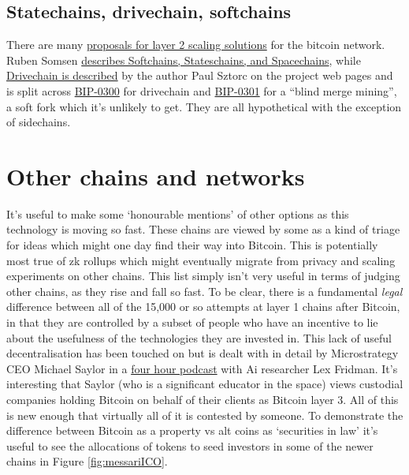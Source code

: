 \subsection{Statechains, drivechain, softchains} 
There are many \href{https://gist.github.com/RubenSomsen/96505e99dc061d6af6b757ff74434e70}{proposals for layer 2 scaling solutions} for the bitcoin network. Ruben Somsen \href{https://gist.github.com/RubenSomsen/c9f0a92493e06b0e29acced61ca9f49a}{describes Softchains, Stateschains, and Spacechains}, while  \href{https://www.drivechain.info/literature/index.html}{Drivechain is described} by the author Paul Sztorc on the project web pages and is split across \href{https://github.com/bitcoin/bips/blob/master/bip-0300.mediawiki}{BIP-0300} for drivechain and \href{https://github.com/bitcoin/bips/blob/master/bip-0301.mediawiki}{BIP-0301} for a ``blind merge mining'', a soft fork which it's unlikely to get. They are all hypothetical with the exception of sidechains.  

\section{Other chains and networks}
It's useful to make some `honourable mentions' of other options as this technology is moving so fast. These chains are viewed by some as a kind of triage for ideas which might one day find their way into Bitcoin. This is potentially most true of zk rollups which might eventually migrate from privacy and scaling experiments on other chains. This list simply isn't very useful in terms of judging other chains, as they rise and fall so fast. To be clear, there is a fundamental \textit{legal} difference between all of the 15,000 or so attempts at layer 1 chains after Bitcoin, in that they are controlled by a subset of people who have an incentive to lie about the usefulness of the technologies they are invested in. This lack of useful decentralisation has been touched on but is dealt with in detail by Microstrategy CEO Michael Saylor in a \href{https://www.youtube.com/watch?v=mC43pZkpTec}{four hour podcast} with Ai researcher Lex Fridman. It's interesting that Saylor (who is a significant educator in the space) views custodial companies holding Bitcoin on behalf of their clients as Bitcoin layer 3. All of this is new enough that virtually all of it is contested by someone. To demonstrate the difference between Bitcoin as a property vs alt coins as `securities in law' it's useful to see the allocations of tokens to seed investors in some of the newer chains in Figure \ref{fig:messariICO}.

